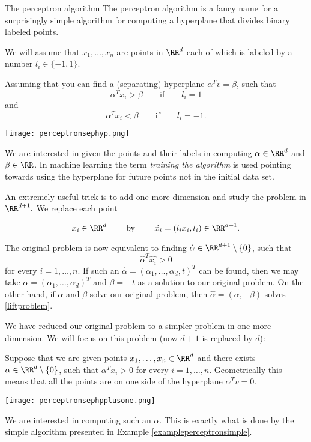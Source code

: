 \documentclass{article}
\begin{document}
\begin{hideinbutton}{The perceptron algorithm}
The perceptron algorithm is a fancy name for a surprisingly simple
algorithm for computing a hyperplane that divides binary labeled
points.

We will assume that $x_1, \dots, x_n$ are
points in $\RR^d$ each of which is labeled by
a number $l_i\in \{-1, 1\}$.

Assuming that you can find a (separating) hyperplane $\alpha^T v = \beta$,
such that
$$
\alpha^T x_i > \beta\qquad\text{if}\qquad l_i = 1
$$
and
$$
\alpha^T x_i < \beta\qquad\text{if}\qquad l_i = -1.
$$


\texttt{[image: perceptronsephyp.png]}


We are interested in given the points and their labels in
computing $\alpha\in \RR^d$ and $\beta\in \RR$. In machine learning
the term \emph{training the algorithm} is used pointing
towards using the hyperplane for future points not in
the initial data set.


An extremely useful trick is to add one more dimension
and study the problem in $\RR^{d+1}.$ We replace
each point

$$
x_i\in \RR^d\qquad\text{ by }\qquad \hat{x_i} = (l_i x_i, l_i)\in \RR^{d+1}.
$$

The original problem is now equivalent to finding $\hat{\alpha}\in \RR^{d+1}\setminus\{0\}$,
such that
\begin{equation}\label{liftproblem}
\hat{\alpha}^T \hat{x_i} > 0
\end{equation}
for every $i = 1, \dots, n$. If such an $\hat{\alpha} = (\alpha_1, \dots, \alpha_d, t)^T$ can
be found, then we may take $\alpha = (\alpha_1, \dots, \alpha_d)^T$ and $\beta = -t$ as
a solution to our original problem.
On the other hand, if $\alpha$ and $\beta$ solve our original problem, then
$\hat{\alpha} = (\alpha, -\beta)$ solves \eqref{liftproblem}.


We have reduced our original problem to a simpler problem in
one more dimension. We will focus on this problem (now $d+1$ is
replaced by $d$):

Suppose that we are given points $x_1, \dots, x_n\in \RR^d$ and
there exists $\alpha\in \RR^d\setminus \{0\}$, such that
$\alpha^T x_i > 0$ for every $i = 1, \dots, n$. Geometrically
this means that all the points are on one side of the
hyperplane $\alpha^T v = 0$.

\texttt{[image: perceptronsephpplusone.png]}


We are interested in computing such an $\alpha$. This is exactly
what is done by the simple
algorithm presented in Example \ref{exampleperceptronsimple}.


\end{hideinbutton}
\end{document}
